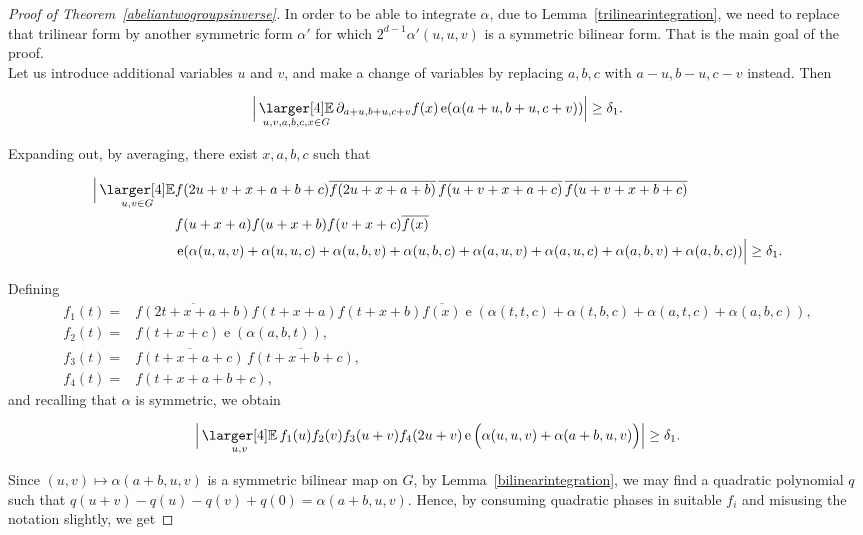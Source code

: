 \documentclass[a4paper,11pt]{article}
\numberwithin{theorem}{section}
\theoremstyle{definition}
\newcommand{\on}[1]{
	\operatorname{#1}
}
\newcommand{\exx}{
  \mathop{
    \mathchoice{\vcenter{\hbox{\larger[4]$\mathbb{E}$}}}
               {\kern0pt\mathbb{E}}
               {\kern0pt\mathbb{E}}
               {\kern0pt\mathbb{E}}
  }\displaylimits
}
\begin{document}
\begin{proof}[Proof of Theorem~\ref{abeliantwogroupsinverse}]
    In order to be able to integrate $\alpha$, due to Lemma~\ref{trilinearintegration}, we need to replace that trilinear form by another symmetric form $\alpha'$ for which $2^{d-1}\alpha'(u,u,v)$ is a symmetric bilinear form. That is the main goal of the proof.\\

    Let us introduce additional variables $u$ and $v$, and make a change of variables by replacing $a,b,c$ with $a - u, b- u, c- v$ instead. Then

    \[\Big|\exx_{u, v, a,b,c,x \in G} \partial_{a + u,b + u,c + v} f(x) \on{e}(\alpha(a + u,b + u,c + v))\Big| \geq \delta_1.\]

    Expanding out, by averaging, there exist $x,a,b,c$ such that

    \begin{align*}\Big|\exx_{u, v \in G} &f(2u + v + x + a + b + c) \overline{f(2u + x + a + b)}\,\overline{f(u + v + x + a + c)}\,\overline{f(u + v + x + b + c)}\\
    &f(u + x + a) f(u + x + b) f(v + x + c) \overline{f(x)}\\
    &\on{e}(\alpha(u,u,v) + \alpha(u,u,c) + \alpha(u,b,v) + \alpha(u,b,c) +\alpha(a,u,v) +\alpha(a,u,c) + \alpha(a,b,v) +\alpha(a,b,c))\Big| \geq \delta_1.\end{align*}
    
    Defining 
    \begin{align*}
        f_1(t) = &\overline{f(2t + x + a + b)}f(t + x + a) f(t + x + b) \overline{f(x)} \on{e}(\alpha(t,t,c) + \alpha(t,b,c)+ \alpha(a,t,c)+\alpha(a,b,c)),\\
        f_2(t) = &f(t + x + c) \on{e}(\alpha(a,b,t) ),\\
        f_3(t) = &\overline{f(t + x + a + c)}\,\overline{f(t + x + b + c)},\\
        f_4(t) = &f(t + x + a + b + c),
    \end{align*}
    and recalling that $\alpha$ is symmetric, we obtain

    \[\Big|\exx_{u , v} f_1(u) f_2(v) f_3(u + v) f_4(2u + v) \on{e}\Big(\alpha(u,u, v) + \alpha(a + b, u, v)\Big)\Big| \geq \delta_1.\]

    Since $(u,v) \mapsto \alpha(a + b, u, v)$ is a symmetric bilinear map on $G$, by Lemma~\ref{bilinearintegration}, we may find a quadratic polynomial $q$ such that $q(u + v) - q(u) - q(v) + q(0) = \alpha(a + b, u, v)$. Hence, by consuming quadratic phases in suitable $f_i$ and misusing the notation slightly, we get


\end{proof}
\end{document}
